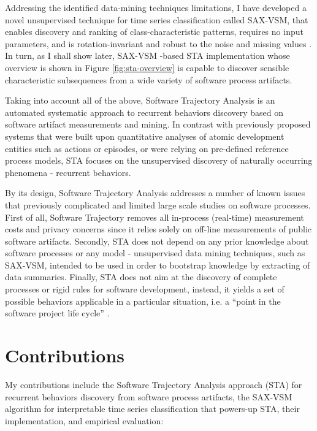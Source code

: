 Addressing the identified data-mining techniques limitations, 
I have developed a novel unsupervised technique for time series classification called SAX-VSM, that enables 
discovery and ranking of class-characteristic patterns, requires no input parameters, and is rotation-invariant 
and robust to the noise and missing values \cite{sax-vsm}. 
In turn, as I shall show later, SAX-VSM -based STA implementation whose overview is shown in Figure \ref{fig:sta-overview} 
is capable to discover sensible characteristic subsequences from a wide variety of software process artifacts.

Taking into account all of the above, Software Trajectory Analysis is an automated systematic approach to 
recurrent behaviors discovery based on software artifact measurements and mining. 
In contrast with previously proposed systems that were built upon quantitative analyses of atomic development 
entities such as actions or episodes, or were relying on pre-defined reference process models, 
STA focuses on the unsupervised discovery of naturally occurring phenomena - recurrent behaviors. 

By its design, Software Trajectory Analysis addresses a number of known issues that previously complicated and 
limited large scale studies on software processes.
First of all, Software Trajectory removes all in-process (real-time) measurement costs and privacy concerns since 
it relies solely on off-line measurements of public software artifacts. 
Secondly, STA does not depend on any prior knowledge about software processes or any model - unsupervised 
data mining techniques, such as SAX-VSM, intended to be used in order to bootstrap knowledge by extracting of 
data summaries. 
Finally, STA does not aim at the discovery of complete processes or rigid rules for software development, instead,
it yields a set of possible behaviors applicable in a particular situation, 
i.e. a ``point in the software project life cycle'' \cite{demillo1980software}.


\section{Contributions}\label{section_contributions}
My contributions include the Software Trajectory Analysis approach (STA) for recurrent behaviors discovery
from software process artifacts, the SAX-VSM algorithm for interpretable time series classification 
that powers-up STA, their implementation, and empirical evaluation: 

